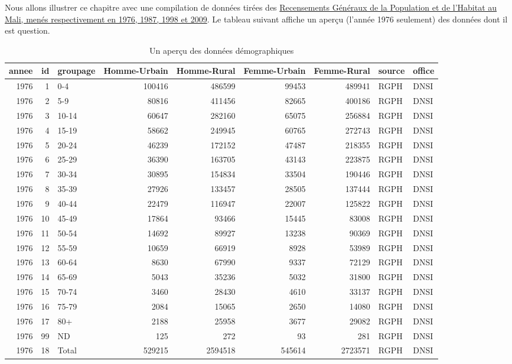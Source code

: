 \documentclass[]{book}
\begin{document}
Nous allons illustrer ce chapitre avec une compilation de données tirées
des \href{https://www.malikunnafoni.com}{Recensements Généraux de la
Population et de l'Habitat au Mali, menés respectivement en 1976, 1987,
1998 et 2009}. Le tableau suivant affiche un aperçu (l'année 1976
seulement) des données dont il est question.

\begin{table}[t]

\caption{\label{tab:unnamed-chunk-228}Un aperçu des données démographiques}
\centering
\begin{tabular}{r|r|l|r|r|r|r|l|l}
\hline
annee & id & groupage & Homme-Urbain & Homme-Rural & Femme-Urbain & Femme-Rural & source & office\\
\hline
1976 & 1 & 0-4 & 100416 & 486599 & 99453 & 489941 & RGPH & DNSI\\
\hline
1976 & 2 & 5-9 & 80816 & 411456 & 82665 & 400186 & RGPH & DNSI\\
\hline
1976 & 3 & 10-14 & 60647 & 282160 & 65075 & 256884 & RGPH & DNSI\\
\hline
1976 & 4 & 15-19 & 58662 & 249945 & 60765 & 272743 & RGPH & DNSI\\
\hline
1976 & 5 & 20-24 & 46239 & 172152 & 47487 & 218355 & RGPH & DNSI\\
\hline
1976 & 6 & 25-29 & 36390 & 163705 & 43143 & 223875 & RGPH & DNSI\\
\hline
1976 & 7 & 30-34 & 30895 & 154834 & 33504 & 190446 & RGPH & DNSI\\
\hline
1976 & 8 & 35-39 & 27926 & 133457 & 28505 & 137444 & RGPH & DNSI\\
\hline
1976 & 9 & 40-44 & 22479 & 116947 & 22007 & 125822 & RGPH & DNSI\\
\hline
1976 & 10 & 45-49 & 17864 & 93466 & 15445 & 83008 & RGPH & DNSI\\
\hline
1976 & 11 & 50-54 & 14692 & 89927 & 13238 & 90369 & RGPH & DNSI\\
\hline
1976 & 12 & 55-59 & 10659 & 66919 & 8928 & 53989 & RGPH & DNSI\\
\hline
1976 & 13 & 60-64 & 8630 & 67990 & 9337 & 72129 & RGPH & DNSI\\
\hline
1976 & 14 & 65-69 & 5043 & 35236 & 5032 & 31800 & RGPH & DNSI\\
\hline
1976 & 15 & 70-74 & 3460 & 28430 & 4610 & 33137 & RGPH & DNSI\\
\hline
1976 & 16 & 75-79 & 2084 & 15065 & 2650 & 14080 & RGPH & DNSI\\
\hline
1976 & 17 & 80+ & 2188 & 25958 & 3677 & 29082 & RGPH & DNSI\\
\hline
1976 & 99 & ND & 125 & 272 & 93 & 281 & RGPH & DNSI\\
\hline
1976 & 18 & Total & 529215 & 2594518 & 545614 & 2723571 & RGPH & DNSI\\
\hline
\end{tabular}
\end{table}
\end{document}
